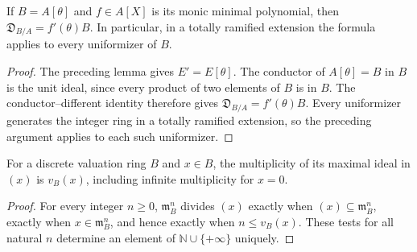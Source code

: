 \begin{lemma}
\label{fw:monogenic-different}
\leanok
If $B=A[\theta]$ and $f\in A[X]$ is its monic minimal polynomial,
then $\mathfrak D_{B/A}=f'(\theta)B$.
In particular, in a totally ramified extension the formula applies to
every uniformizer of $B$.
\end{lemma}
\begin{proof}
The preceding lemma gives $E'=E[\theta]$. The conductor of
$A[\theta]=B$ in $B$ is the unit ideal, since every product of two
elements of $B$ is in $B$. The conductor--different identity
therefore gives $\mathfrak D_{B/A}=f'(\theta)B$.
Every uniformizer generates the integer ring in a totally ramified
extension, so the preceding argument applies to each such uniformizer.
\end{proof}

\begin{lemma}
\label{fw:ideal-order-generator}
\leanok
For a discrete valuation ring $B$ and $x\in B$, the multiplicity
of its maximal ideal in $(x)$ is $v_B(x)$, including infinite
multiplicity for $x=0$.
\end{lemma}
\begin{proof}
For every integer $n\geq0$, $\mathfrak m_B^n$ divides $(x)$ exactly
when $(x)\subseteq\mathfrak m_B^n$, exactly when
$x\in\mathfrak m_B^n$, and hence exactly when $n\leq v_B(x)$.
These tests for all natural $n$ determine an element of
$\mathbb N\cup\{+\infty\}$ uniquely.
\end{proof}

